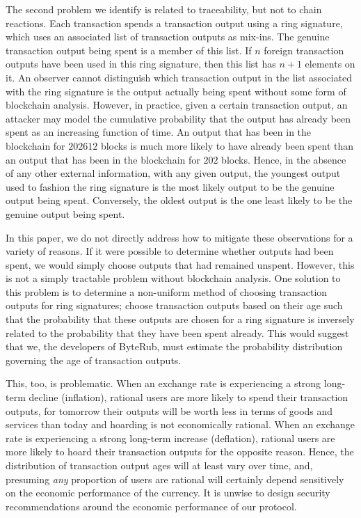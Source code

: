 \documentclass[12pt,english]{mrl}
\theoremstyle{definition}
\numberwithin{equation}{section}
\numberwithin{figure}{section}
\numberwithin{equation}{section}
\numberwithin{equation}{section}
\numberwithin{figure}{section}
\begin{document}
The second problem we identify is related to traceability, but not to chain reactions.  Each transaction spends a transaction output using a ring signature, which uses an associated list of transaction outputs as mix-ins. The genuine transaction output being spent is a member of this list. If $n$ foreign transaction outputs have been used in this ring signature, then this list has $n+1$ elements on it. An observer cannot distinguish which transaction output in the list associated with the ring signature is the output actually being spent without some form of blockchain analysis. However, in practice, given a certain transaction output, an attacker may model the cumulative probability that the output has already been spent as an increasing function of time. An output that has been in the blockchain for $202612$ blocks is much more likely to have already been spent than an output that has been in the blockchain for $202$ blocks. Hence, in the absence of any other external information, with any given output, the youngest output used to fashion the ring signature is the most likely output to be the genuine output being spent. Conversely, the oldest output is the one least likely to be the genuine output being spent. 

In this paper, we do not directly address how to mitigate these observations for a variety of reasons. If it were possible to determine whether outputs had been spent, we would simply choose outputs that had remained unspent. However, this is not a simply tractable problem without blockchain analysis. One solution to this problem is to determine a non-uniform method of choosing transaction outputs for ring signatures; choose transaction outputs based on their age such that the probability that these outputs are chosen for a ring signature is inversely related to the probability that they have been spent already. This would suggest that we, the developers of ByteRub, must estimate the probability distribution governing the age of transaction outputs. 

This, too, is problematic. When an exchange rate is experiencing a strong long-term decline (inflation), rational users are more likely to spend their transaction outputs, for tomorrow their outputs will be worth less in terms of goods and services than today and hoarding is not economically rational. When an exchange rate is experiencing a strong long-term increase (deflation), rational users are more likely to hoard their transaction outputs for the opposite reason. Hence, the distribution of transaction output ages will at least vary over time, and, presuming \textit{any} proportion of users are rational will certainly depend sensitively on the economic performance of the currency. It is unwise to design security recommendations around the economic performance of our protocol. 
\end{document}
